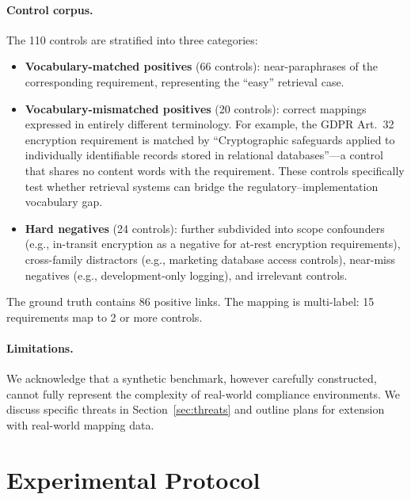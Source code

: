 \documentclass{sn-jnl}
\begin{document}
\paragraph{Control corpus.}
The 110 controls are stratified into three categories:
\begin{itemize}
    \item \textbf{Vocabulary-matched positives} (66 controls): near-paraphrases of the corresponding requirement, representing the ``easy'' retrieval case.

    \item \textbf{Vocabulary-mismatched positives} (20 controls): correct mappings expressed in entirely different terminology.
    For example, the GDPR Art.~32 encryption requirement is matched by ``Cryptographic safeguards applied to individually identifiable records stored in relational databases''---a control that shares no content words with the requirement.
    These controls specifically test whether retrieval systems can bridge the regulatory--implementation vocabulary gap.

    \item \textbf{Hard negatives} (24 controls): further subdivided into scope confounders (e.g., in-transit encryption as a negative for at-rest encryption requirements), cross-family distractors (e.g., marketing database access controls), near-miss negatives (e.g., development-only logging), and irrelevant controls.
\end{itemize}

The ground truth contains 86 positive links. The mapping is multi-label: 15 requirements map to 2 or more controls.

\paragraph{Limitations.}
We acknowledge that a synthetic benchmark, however carefully constructed, cannot fully represent the complexity of real-world compliance environments.
We discuss specific threats in Section~\ref{sec:threats} and outline plans for extension with real-world mapping data.


\section{Experimental Protocol}
\label{sec:protocol}
\end{document}
